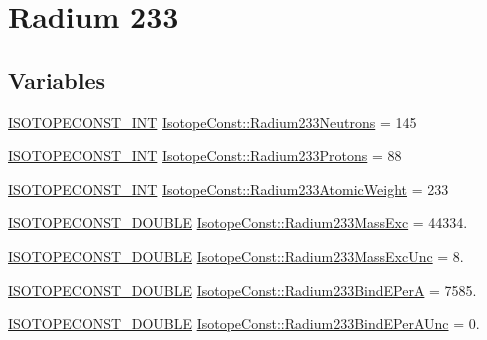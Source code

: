 \hypertarget{group___isotope_const-_radium-_ra233}{}\section{Radium 233}
\label{group___isotope_const-_radium-_ra233}
\subsection*{Variables}
\begin{DoxyCompactItemize}
\item 
\mbox{\hyperlink{group___isotope_const-_macros_ga5f18360b3e99483a35c32d789e62621c}{I\+S\+O\+T\+O\+P\+E\+C\+O\+N\+S\+T\+\_\+\+I\+NT}} \mbox{\hyperlink{group___isotope_const-_radium-_ra233_ga667214f896967f656711f0ed5d5e9342}{Isotope\+Const\+::\+Radium233\+Neutrons}} = 145
\item 
\mbox{\hyperlink{group___isotope_const-_macros_ga5f18360b3e99483a35c32d789e62621c}{I\+S\+O\+T\+O\+P\+E\+C\+O\+N\+S\+T\+\_\+\+I\+NT}} \mbox{\hyperlink{group___isotope_const-_radium-_ra233_gad354ba8060df0799c999aa4ee35b2062}{Isotope\+Const\+::\+Radium233\+Protons}} = 88
\item 
\mbox{\hyperlink{group___isotope_const-_macros_ga5f18360b3e99483a35c32d789e62621c}{I\+S\+O\+T\+O\+P\+E\+C\+O\+N\+S\+T\+\_\+\+I\+NT}} \mbox{\hyperlink{group___isotope_const-_radium-_ra233_gad8dc237eae217c75c91ccb4eda06bfc5}{Isotope\+Const\+::\+Radium233\+Atomic\+Weight}} = 233
\item 
\mbox{\hyperlink{group___isotope_const-_macros_ga8f45a7272ce02c0b4c65c44636ed719a}{I\+S\+O\+T\+O\+P\+E\+C\+O\+N\+S\+T\+\_\+\+D\+O\+U\+B\+LE}} \mbox{\hyperlink{group___isotope_const-_radium-_ra233_ga9ca4ae8e645252c89e3a4b91505c5aa2}{Isotope\+Const\+::\+Radium233\+Mass\+Exc}} = 44334.
\item 
\mbox{\hyperlink{group___isotope_const-_macros_ga8f45a7272ce02c0b4c65c44636ed719a}{I\+S\+O\+T\+O\+P\+E\+C\+O\+N\+S\+T\+\_\+\+D\+O\+U\+B\+LE}} \mbox{\hyperlink{group___isotope_const-_radium-_ra233_gaa867d1fd5366a303c0b3b8f5880874b3}{Isotope\+Const\+::\+Radium233\+Mass\+Exc\+Unc}} = 8.
\item 
\mbox{\hyperlink{group___isotope_const-_macros_ga8f45a7272ce02c0b4c65c44636ed719a}{I\+S\+O\+T\+O\+P\+E\+C\+O\+N\+S\+T\+\_\+\+D\+O\+U\+B\+LE}} \mbox{\hyperlink{group___isotope_const-_radium-_ra233_gab038231c24ba3cddcc229f49d454130d}{Isotope\+Const\+::\+Radium233\+Bind\+E\+PerA}} = 7585.
\item 
\mbox{\hyperlink{group___isotope_const-_macros_ga8f45a7272ce02c0b4c65c44636ed719a}{I\+S\+O\+T\+O\+P\+E\+C\+O\+N\+S\+T\+\_\+\+D\+O\+U\+B\+LE}} \mbox{\hyperlink{group___isotope_const-_radium-_ra233_ga206a79f6bc883283e78f813a6a0a92b0}{Isotope\+Const\+::\+Radium233\+Bind\+E\+Per\+A\+Unc}} = 0.

\end{DoxyCompactItemize}
